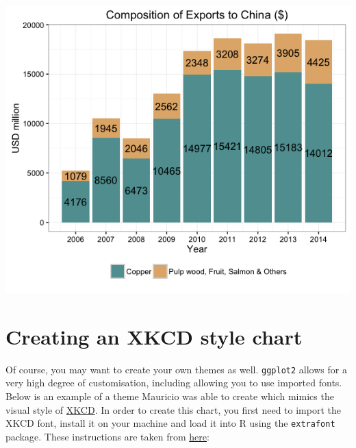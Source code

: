 \begin{center}\includegraphics[width=0.55\linewidth]{0_all_posts_pdf/bar_9-1} \end{center}

\section{Creating an XKCD style
chart}\label{creating-an-xkcd-style-chart-2}

Of course, you may want to create your own themes as well.
\texttt{ggplot2} allows for a very high degree of customisation,
including allowing you to use imported fonts. Below is an example of a
theme Mauricio was able to create which mimics the visual style of
\href{http://xkcd.com/}{XKCD}. In order to create this chart, you first
need to import the XKCD font, install it on your machine and load it
into R using the \texttt{extrafont} package. These instructions are
taken from
\href{https://www.google.com.au/url?sa=t\&rct=j\&q=\&esrc=s\&source=web\&cd=1\&ved=0ahUKEwiWzafchdPJAhVBpJQKHe_LDT8QFggbMAA\&url=https\%3A\%2F\%2Fcran.r-project.org\%2Fweb\%2Fpackages\%2Fxkcd\%2Fvignettes\%2Fxkcd-intro.pdf\&usg=AFQjCNE-KciGY14e-Q1buYIVmTFC0ht__Q\&sig2=DZUwkvIHwfNWtTtkcz94jg}{here}:

\begin{Shaded}
\begin{Highlighting}[]

\NormalTok{(}\NormalTok{, }
\StringTok{      }\NormalTok{, }\NormalTok{)}
\NormalTok{(}\NormalTok{)}
\NormalTok{(}\NormalTok{)}
\NormalTok{(} \NormalTok{, }\NormalTok{)}
\NormalTok{()}
\NormalTok{()}
\end{Highlighting}
\end{Shaded}

